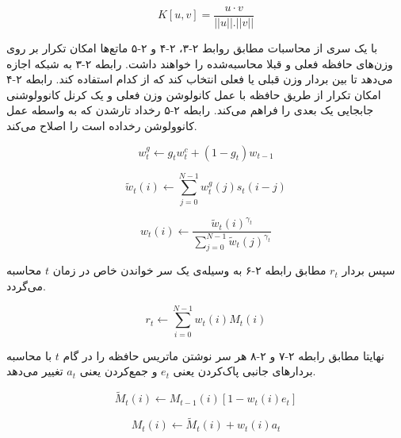 \begin{equation}
K[u, v] = \frac{u·v}{||u||.||v||} 
\end{equation}

با یک سری از محاسبات مطابق روابط ۲-۳، ۲-۴ و ۲-۵ ماتع‌ها امکان تکرار بر روی وزن‌های حافظه فعلی و قبلا محاسبه‌شده را خواهند داشت. رابطه ۲-۳ به شبکه اجازه می‌دهد تا بین بردار وزن قبلی یا فعلی انتخاب کند که از کدام استفاده کند. رابطه ۲-۴ امکان تکرار از طریق حافظه با عمل کانولوشن وزن فعلی و یک کرنل کانوولوشنی جابجایی یک بعدی را فراهم می‌کند. رابطه ۲-۵ رخداد تارشدن که به واسطه عمل کانوولوشن رخداده است را اصلاح می‌کند.


\begin{equation}
w^g_t \leftarrow g_t w^c_t + (1 − g_t)w_{t−1}
\end{equation}

\begin{equation}
\tilde{w}_t(i) \leftarrow \sum^{N-1}_{j=0} w^g_t(j)s_t(i − j)
\end{equation}

\begin{equation}
w_t(i) \leftarrow \frac{\tilde{w}_t(i)^{\gamma_t}}{\sum_{j=0}^{N-1}\tilde{w}_t(j)^{\gamma_t}}
\end{equation}

سپس بردار $r_t$ مطابق رابطه ۲-۶ به وسیله‌ی یک سر خواندن خاص در زمان $t$ محاسبه می‌گردد.

\begin{equation}
r_t \leftarrow \sum_{i=0}^{N-1} w_t(i)M_t(i)
\end{equation}

نهایتا مطابق رابطه ۲-۷ و ۲-۸ هر سر نوشتن ماتریس حافظه را در گام $t$ با محاسبه بردارهای جانبی پاک‌کردن یعنی $e_t$ و جمع‌‌کردن یعنی $a_t$ تغییر می‌دهد.

\begin{equation}
\tilde{M}_t(i) \leftarrow M_{t-1}(i)[1-w_t(i)e_t]
\end{equation}

\begin{equation}
M_t(i) \leftarrow \tilde{M}_t(i) + w_t(i)a_t
\end{equation}

